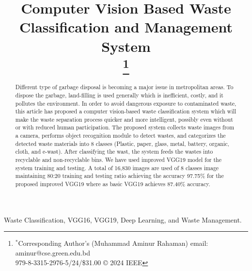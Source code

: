 \documentclass[conference]{IEEEtran}
\begin{document}
\title{Computer Vision Based Waste Classification and Management System\\

{\footnotesize \textsuperscript{}}
\thanks{$^*$Corresponding Author's (Muhammad Aminur Rahaman) email: aminur@cse.green.edu.bd\\979-8-3315-2976-5/24/\$31.00 © 2024 IEEE}
}

    

\author{
}


\maketitle 

\begin{abstract}
Different type of garbage disposal is becoming a major issue in metropolitan areas. To dispose the garbage, land-filling is used generally which is inefficient, costly, and it pollutes the environment. In order to avoid dangerous exposure to contaminated waste, this article has proposed a computer vision-based waste classification system which will make the waste separation process quicker and more intelligent, possibly even without or with reduced human participation.  The proposed system collects waste images from a camera, performs object recognition module to detect wastes, and categorizes the detected waste materials into 8 classes (Plastic, paper, glass, metal, battery, organic, cloth, and e-wast). After classifying the wast, the system feeds the wastes into recyclable and non-recyclable bins. We have used improved VGG19 model for the system training and testing.  A total of
16,830 images are used of 8 classes image maintaining 80:20 training and testing ratio achieving the accuracy 97.75\% for the proposed improved VGG19 where as basic VGG19 achieves 87.40\% accuracy. 

\end{abstract}

\begin{IEEEkeywords}
Waste Classification, VGG16, VGG19, Deep Learning, and Waste Management.
\end{IEEEkeywords}
\end{document}

